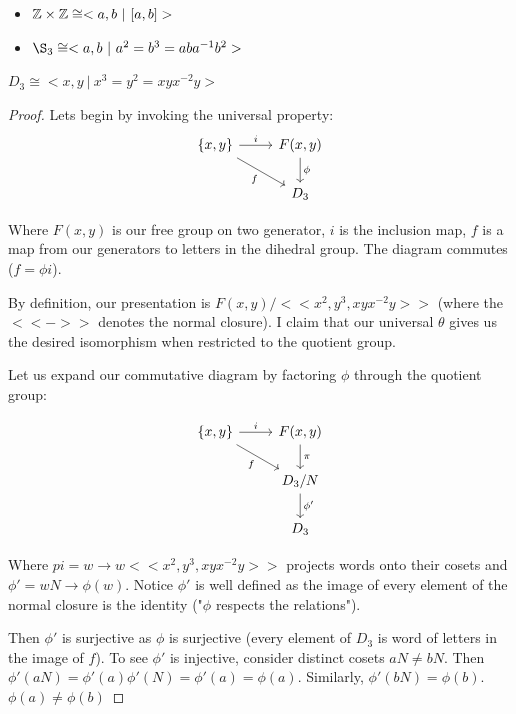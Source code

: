 \documentclass[10pt]{article}
\begin{document}
\begin{itemize}
	\item{$\mathbb{Z} \times \mathbb{Z} \cong <a,b~|~[a,b]>$}
	\item{$\S_3 \cong <a,b~|~a^2=b^3=aba^{-1}b^2>$}
\end{itemize}

\begin{proposition}
	$D_3 \cong <x,y~|~x^3=y^2=xyx^{-2}y>$
\end{proposition}

\begin{proof}

	Lets begin by invoking the universal property:
	\[
	\begin{tikzcd}
	{\{x, y\}} \arrow[rd, "f"'] \arrow[r, "i"] & {F(x, y)} \arrow[d, "\phi"] \\
																						 & D_3                        
	\end{tikzcd}
	\]

	Where $F(x, y)$ is our free group on two generator, $i$ is the inclusion map,
	$f$ is a map from our generators to letters in the dihedral group. The
	diagram commutes ($f = \phi i$).

	By definition, our presentation is $F(x, y) / << x^2, y^3, xyx^{-2}y >>$
	(where the $<<->>$ denotes the normal closure). I claim that our universal
	$\theta$ gives us the desired isomorphism when restricted to the quotient
	group.

	Let us expand our commutative diagram by factoring $\phi$ through the
	quotient group:

	\[
	\begin{tikzcd}
	{\{x, y\}} \arrow[rd, "f"'] \arrow[r, "i"] & {F(x, y)} \arrow[d, "\pi"]   \\
																						 & D_3 / N \arrow[d, "\phi'"] \\
																						 & D_3                         
	\end{tikzcd}
	\]

	Where $pi = w \to w << x^2, y^3, xyx^{-2}y >>$ projects words onto
	their cosets and $\phi' = wN \to \phi(w)$. Notice $\phi'$ is well defined as
	the image of every element of the normal closure is the identity ("$\phi$
	respects the relations").

	Then $\phi'$ is surjective as $\phi$ is surjective (every element of $D_3$ is
	word of letters in the image of $f$). To see $\phi'$ is injective, consider
	distinct cosets $aN \neq bN$. Then $\phi'(aN) = \phi'(a)\phi'(N) = \phi'(a) =
	\phi(a)$. Similarly, $\phi'(bN) = \phi(b)$. $\phi(a) \neq \phi(b)$

\end{proof}
\end{document}
